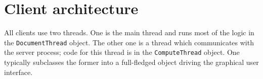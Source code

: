 
\section{Client architecture}

All clients use two threads. One is the main thread and runs most of
the logic in the {\tt DocumentThread} object. The other one is a
thread which communicates with the server process; code for this
thread is in the {\tt ComputeThread} object.  One typically subclasses
the former into a full-fledged object driving the graphical user
interface.

